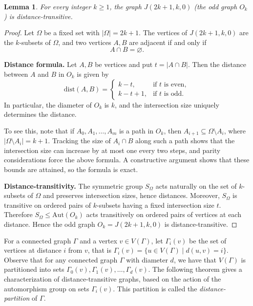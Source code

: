 \documentclass[12pt,a4paper,openany]{book}
\newtheorem{lemma}{Lemma}[section]
\newcommand{\Aut}{\mathrm{Aut}}
\begin{document}
\begin{lemma}\label{lem:odd-distance-transitive}
For every integer $k \ge 1$, the graph $J(2k+1,k,0)$ (the odd graph $O_k$) is
distance-transitive.
\end{lemma}

\begin{proof}
Let $\Omega$ be a fixed set with $|\Omega| = 2k+1$. The vertices of $J(2k+1,k,0)$
are the $k$-subsets of $\Omega$, and two vertices $A,B$ are adjacent if and only if
\[
A \cap B = \varnothing .
\]

\medskip
\noindent
\textbf{Distance formula.}
Let $A,B$ be vertices and put $t = |A \cap B|$.
Then the distance between $A$ and $B$ in $O_k$ is given by
\[
\text{dist}(A,B) =
\begin{cases}
k - t, & \text{if $t$ is even},\\[4pt]
k - t + 1, & \text{if $t$ is odd}.
\end{cases}
\]
In particular, the diameter of $O_k$ is $k$, and the intersection size uniquely
determines the distance.

To see this, note that if $A_0, A_1, \dots, A_m$ is a path in $O_k$, then
$A_{i+1} \subseteq \Omega \setminus A_i$, where $|\Omega \setminus A_i| = k+1$.
Tracking the size of $A_i \cap B$ along such a path shows that the intersection
size can increase by at most one every two steps, and parity considerations force
the above formula. A constructive argument shows that these bounds are attained,
so the formula is exact.

\medskip
\noindent
\textbf{Distance-transitivity.}
The symmetric group $S_\Omega$ acts naturally on the set of $k$-subsets of $\Omega$
and preserves intersection sizes, hence distances.
Moreover, $S_\Omega$ is transitive on ordered pairs of $k$-subsets having a fixed
intersection size $t$.
Therefore $S_\Omega \le \Aut(O_k)$ acts transitively on ordered pairs of vertices
at each distance. Hence the odd graph $O_k = J(2k+1,k,0)$ is distance-transitive.
\end{proof}


For a connected graph $\Gamma$ and a vertex $v \in V(\Gamma)$, let $\Gamma_i(v)$ be the set of vertices at distance $i$ from $v$, that is $\Gamma_i(v) = \{u \in V(\Gamma) \mid d(u, v) = i\}$. Observe that for any connected graph $\Gamma$ with diameter $d$, we have that $V(\Gamma)$ is partitioned into sets $\Gamma_0(v), \Gamma_1(v), \dots, \Gamma_d(v)$. The following theorem gives a characterization of distance-transitive graphs, based on the action of the automorphism group on sets $\Gamma_i(v)$. This partition is called the \emph{distance-partition} of $\Gamma$.
\end{document}
